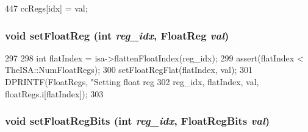 \begin{DoxyCode}
447 { ccRegs[idx] = val; }
\end{DoxyCode}
\hypertarget{classSimpleThread_ab6fd8e55b81c173f448ec0c42bc28b99}{
\subsubsection[{setFloatReg}]{\setlength{\rightskip}{0pt plus 5cm}void setFloatReg (int {\em reg\_\-idx}, \/  {\bf FloatReg} {\em val})}}
\label{classSimpleThread_ab6fd8e55b81c173f448ec0c42bc28b99}



\begin{DoxyCode}
297     {
298         int flatIndex = isa->flattenFloatIndex(reg_idx);
299         assert(flatIndex < TheISA::NumFloatRegs);
300         setFloatRegFlat(flatIndex, val);
301         DPRINTF(FloatRegs, "Setting float reg %
302                 reg_idx, flatIndex, val, floatRegs.i[flatIndex]);
303     }
\end{DoxyCode}
\hypertarget{classSimpleThread_a618651078f08ecd328dfe3312f0f2ea7}{
\subsubsection[{setFloatRegBits}]{\setlength{\rightskip}{0pt plus 5cm}void setFloatRegBits (int {\em reg\_\-idx}, \/  {\bf FloatRegBits} {\em val})}}
\label{classSimpleThread_a618651078f08ecd328dfe3312f0f2ea7}




